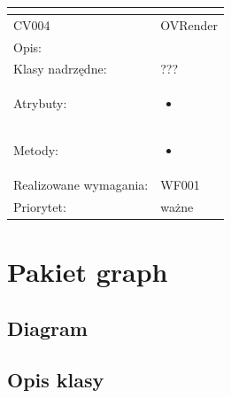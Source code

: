 \documentclass[a4paper,10pt]{article}
\begin{document}
\begin{center}
\begin{longtable}{|m{3cm}|m{9cm}|}
\multicolumn{2}{c}{} \\
 \hline

CV004 & OVRender \\ \hline
Opis: &     \\ \hline
Klasy nadrzędne: &  ???   \\ \hline
Atrybuty: & \begin{itemize}
 \item 
\end{itemize}
 \\ \hline
Metody: & \begin{itemize}
 \item 
\end{itemize}
  \\ \hline
Realizowane wymagania: & WF001 \\ \hline
Priorytet: & ważne  \\ \hline



\end{longtable}

\end{center}

\section{Pakiet graph}

\subsection{Diagram}


\subsection{Opis klasy}
\end{document}
